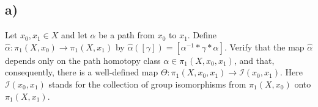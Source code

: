 \documentclass{article}
\theoremstyle{definition}
\begin{document}
    \subsection*{a)}
        \begin{mdframed}
            Let $x_0, x_1 \in X$ and let $\alpha$ be a path from $x_0$ to $x_1$. Define $\hat \alpha : \pi_1(X,x_0) \rightarrow \pi_1(X,x_1)$
            by $\hat \alpha([\gamma]) = [\alpha^{-1} * \gamma * \alpha]$. Verify that the map $\hat \alpha$ depends only on the path homotopy class $\alpha \in \pi_1(X,x_0,x_1)$,
            and that, consequently, there is a well-defined map $\Theta:\pi_1(X,x_0,x_1)\rightarrow\mathcal{I}(x_0,x_1)$. Here $\mathcal{I}(x_0,x_1)$ stands for 
            the collection of group isomorphisms from $\pi_1(X,x_0)$ onto $\pi_1(X,x_1)$.
        \end{mdframed}
\end{document}
